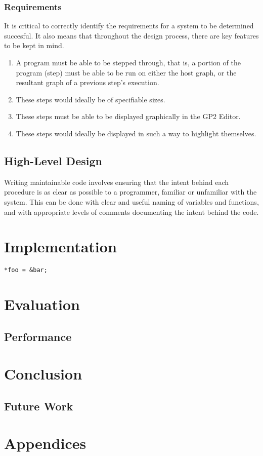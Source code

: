 \documentclass{UoYCSproject}
\begin{document}
\subsection{Requirements}
It is critical to correctly identify the requirements for a system to be determined succesful. It also means that throughout the design process, there are key features to be kept in mind. 
\begin{enumerate}
	\item A program must be able to be stepped through, that is, a portion of the program (step) must be able to be run on either the host graph, or the resultant graph of a previous step's execution.
	\item These steps would ideally be of specifiable sizes.
	\item These steps must be able to be displayed graphically in the GP2 Editor.
	\item These steps would ideally be displayed in such a way to highlight themselves.
\end{enumerate}



\section{High-Level Design}
Writing maintainable code involves ensuring that the intent behind each procedure is as clear as possible to a programmer, familiar or unfamiliar with the system. This can be done with clear and useful naming of variables and functions, and with appropriate levels of comments documenting the intent behind the code.

 
\chapter{Implementation}


\begin{lstlisting}[label=c_1, caption=Placeholder C Code]
*foo = &bar;
\end{lstlisting}


\chapter{Evaluation}
\section{Performance}


\chapter{Conclusion}
\section{Future Work}



\chapter{Appendices}
\end{document}
